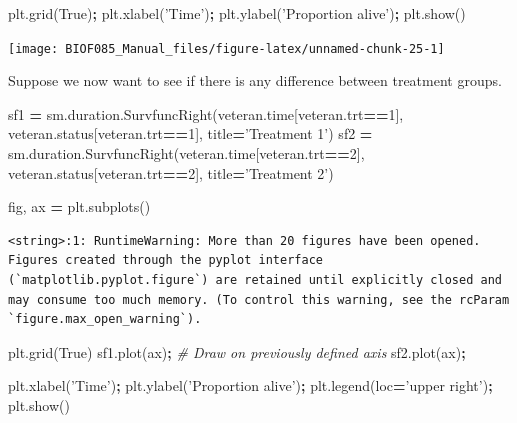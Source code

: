 \documentclass[
  letterpaper,
]{scrbook}
\newenvironment{Shaded}{\begin{snugshade}}{\end{snugshade}}
\newcommand{\CommentTok}[1]{\textcolor[rgb]{0.56,0.35,0.01}{\textit{#1}}}
\newcommand{\DecValTok}[1]{\textcolor[rgb]{0.00,0.00,0.81}{#1}}
\newcommand{\NormalTok}[1]{#1}
\newcommand{\OperatorTok}[1]{\textcolor[rgb]{0.81,0.36,0.00}{\textbf{#1}}}
\newcommand{\StringTok}[1]{\textcolor[rgb]{0.31,0.60,0.02}{#1}}
\newcommand{\VariableTok}[1]{\textcolor[rgb]{0.00,0.00,0.00}{#1}}
\begin{document}
\begin{Shaded}
\begin{Highlighting}[]
\NormalTok{plt.grid(}\VariableTok{True}\NormalTok{)}\OperatorTok{;}
\NormalTok{plt.xlabel(}\StringTok{'Time'}\NormalTok{)}\OperatorTok{;}
\NormalTok{plt.ylabel(}\StringTok{'Proportion alive'}\NormalTok{)}\OperatorTok{;}
\NormalTok{plt.show()}
\end{Highlighting}
\end{Shaded}

\begin{center}\texttt{[image: BIOF085\_Manual\_files/figure-latex/unnamed-chunk-25-1]} \end{center}

Suppose we now want to see if there is any difference between treatment groups.

\begin{Shaded}
\begin{Highlighting}[]
\NormalTok{sf1 }\OperatorTok{=}\NormalTok{ sm.duration.SurvfuncRight(veteran.time[veteran.trt}\OperatorTok{==}\DecValTok{1}\NormalTok{], veteran.status[veteran.trt}\OperatorTok{==}\DecValTok{1}\NormalTok{], title}\OperatorTok{=}\StringTok{'Treatment 1'}\NormalTok{)}
\NormalTok{sf2 }\OperatorTok{=}\NormalTok{ sm.duration.SurvfuncRight(veteran.time[veteran.trt}\OperatorTok{==}\DecValTok{2}\NormalTok{], veteran.status[veteran.trt}\OperatorTok{==}\DecValTok{2}\NormalTok{], title}\OperatorTok{=}\StringTok{'Treatment 2'}\NormalTok{)}

\NormalTok{fig, ax }\OperatorTok{=}\NormalTok{ plt.subplots()}
\end{Highlighting}
\end{Shaded}

\begin{verbatim}
<string>:1: RuntimeWarning: More than 20 figures have been opened. Figures created through the pyplot interface (`matplotlib.pyplot.figure`) are retained until explicitly closed and may consume too much memory. (To control this warning, see the rcParam `figure.max_open_warning`).
\end{verbatim}

\begin{Shaded}
\begin{Highlighting}[]
\NormalTok{plt.grid(}\VariableTok{True}\NormalTok{)}
\NormalTok{sf1.plot(ax)}\OperatorTok{;} \CommentTok{# Draw on previously defined axis}
\NormalTok{sf2.plot(ax)}\OperatorTok{;}

\NormalTok{plt.xlabel(}\StringTok{'Time'}\NormalTok{)}\OperatorTok{;}
\NormalTok{plt.ylabel(}\StringTok{'Proportion alive'}\NormalTok{)}\OperatorTok{;}
\NormalTok{plt.legend(loc}\OperatorTok{=}\StringTok{'upper right'}\NormalTok{)}\OperatorTok{;}
\NormalTok{plt.show()}
\end{Highlighting}
\end{Shaded}
\end{document}
